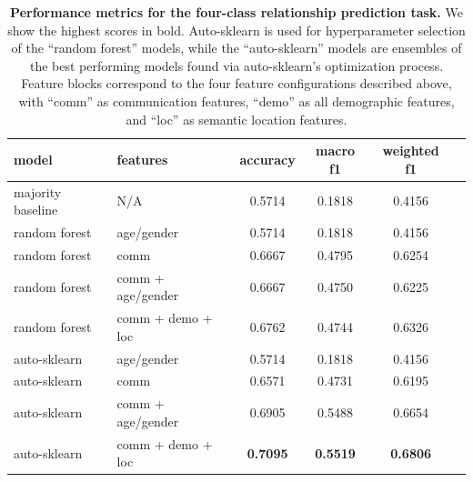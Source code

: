 \documentclass[acmlarge]{acmart}
\begin{document}

\begin{table}[h!]
    \centering
        \begin{tabular}{llcccc}
        \toprule
                     model &    features &  accuracy &  macro f1 &  weighted f1 \\
        \midrule
         majority baseline &         N/A &    0.5714  &    0.1818 &       0.4156 \\
         \midrule
            random forest & age/gender & 0.5714 &    0.1818 &       0.4156 \\
             random forest &    comm &    0.6667 &    0.4795 &       0.6254 \\
             random forest &  comm + age/gender &    0.6667 &    0.4750 &       0.6225 \\
             random forest & comm + demo + loc &    0.6762 &    0.4744 &       0.6326 \\
        \midrule
                    auto-sklearn & age/gender & 0.5714 &    0.1818 &       0.4156 \\
                    auto-sklearn & comm &    0.6571 &    0.4731 &       0.6195 \\
                    auto-sklearn &  comm + age/gender &    0.6905 &    0.5488 &       0.6654 \\
                    auto-sklearn & comm + demo + loc &    \textbf{0.7095} &    \textbf{0.5519} &       \textbf{0.6806} \\
        \bottomrule
        \end{tabular}

        \caption{\textbf{Performance metrics for the four-class relationship prediction task.} We show the highest scores in bold. Auto-sklearn is used for hyperparameter selection of the ``random forest'' models, while the ``auto-sklearn'' models are ensembles of the best performing models found via auto-sklearn's optimization process. Feature blocks correspond to the four feature configurations described above, with ``comm'' as communication features, ``demo'' as all demographic features, and ``loc'' as semantic location features. }
        \label{tab:top5_4class_metrics}
\end{table}
\end{document}
